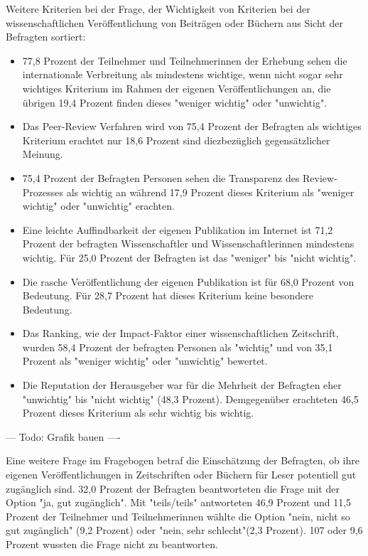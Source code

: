 Weitere Kriterien bei der Frage, der Wichtigkeit von Kriterien bei der wissenschaftlichen Veröffentlichung von Beiträgen oder Büchern aus Sicht der Befragten sortiert:
\begin{itemize}
\item 77,8 Prozent der Teilnehmer und Teilnehmerinnen der Erhebung sehen die internationale Verbreitung als mindestens wichtige, wenn nicht sogar sehr wichtiges Kriterium im Rahmen der eigenen Veröffentlichungen an, die übrigen 19,4 Prozent finden dieses "weniger wichtig" oder "unwichtig".
\item Das Peer-Review Verfahren wird von 75,4 Prozent der Befragten als wichtiges Kriterium erachtet nur 18,6 Prozent sind diezbezüglich gegensätzlicher Meinung.
\item 75,4 Prozent der Befragten Personen sehen die Transparenz des Review-Prozesses als wichtig an während 17,9 Prozent dieses Kriterium als "weniger wichtig" oder "unwichtig" erachten.
\item Eine leichte Auffindbarkeit der eigenen Publikation im Internet ist 71,2 Prozent der befragten Wissenschaftler und Wissenschaftlerinnen mindestens wichtig. Für 25,0 Prozent der Befragten ist das "weniger" bis "nicht wichtig".
\item Die rasche Veröffentlichung der eigenen Publikation ist für 68,0 Prozent von Bedeutung. Für 28,7 Prozent hat dieses Kriterium keine besondere Bedeutung.
\item Das Ranking, wie der Impact-Faktor einer wissenschaftlichen Zeitschrift, wurden 58,4 Prozent der befragten Personen als "wichtig" und von 35,1 Prozent als "weniger wichtig" oder "unwichtig" bewertet.
\item Die Reputation der Herausgeber war für die Mehrheit der Befragten eher "unwichtig" bis "nicht wichtig" (48,3 Prozent). Demgegenüber erachteten 46,5 Prozent dieses Kriterium als sehr wichtig bis wichtig.
\end{itemize}

--- Todo: Grafik bauen ----

Eine weitere Frage im Fragebogen betraf die Einschätzung der Befragten, ob ihre eigenen Veröffentlichungen in Zeitschriften oder Büchern für Leser potentiell gut zugänglich sind. 32,0 Prozent der Befragten beantworteten die Frage mit der Option "ja, gut zugänglich". Mit "teils/teils" antworteten 46,9 Prozent und 11,5 Prozent der Teilnehmer und Teilnehmerinnen wählte die Option "nein, nicht so gut zugänglich" (9,2 Prozent) oder "nein, sehr schlecht"(2,3 Prozent). 107 oder 9,6 Prozent wussten die Frage nicht zu beantworten.

